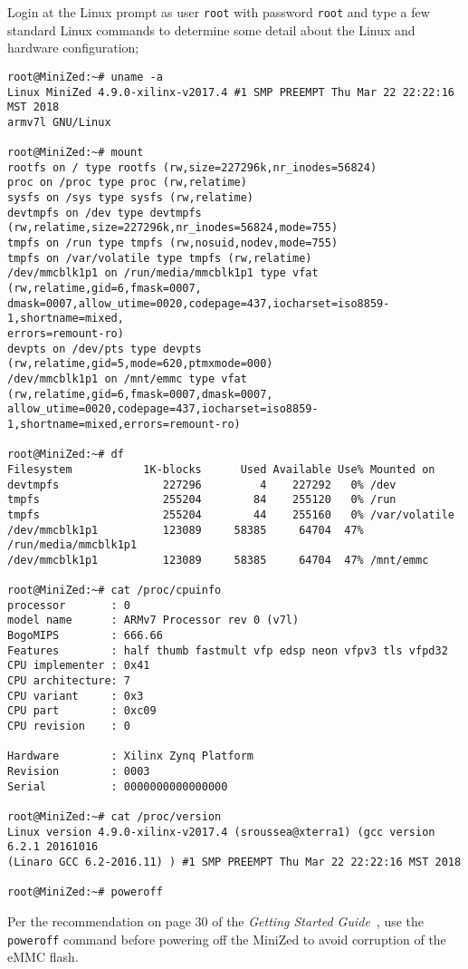 \newpage
Login at the Linux prompt as user \verb+root+ with password \verb+root+
and type a few standard Linux commands to determine some detail about
the Linux and hardware configuration;
%
\begin{verbatim}
root@MiniZed:~# uname -a
Linux MiniZed 4.9.0-xilinx-v2017.4 #1 SMP PREEMPT Thu Mar 22 22:22:16 MST 2018
armv7l GNU/Linux

root@MiniZed:~# mount
rootfs on / type rootfs (rw,size=227296k,nr_inodes=56824)
proc on /proc type proc (rw,relatime)
sysfs on /sys type sysfs (rw,relatime)
devtmpfs on /dev type devtmpfs (rw,relatime,size=227296k,nr_inodes=56824,mode=755)
tmpfs on /run type tmpfs (rw,nosuid,nodev,mode=755)
tmpfs on /var/volatile type tmpfs (rw,relatime)
/dev/mmcblk1p1 on /run/media/mmcblk1p1 type vfat (rw,relatime,gid=6,fmask=0007,
dmask=0007,allow_utime=0020,codepage=437,iocharset=iso8859-1,shortname=mixed,
errors=remount-ro)
devpts on /dev/pts type devpts (rw,relatime,gid=5,mode=620,ptmxmode=000)
/dev/mmcblk1p1 on /mnt/emmc type vfat (rw,relatime,gid=6,fmask=0007,dmask=0007,
allow_utime=0020,codepage=437,iocharset=iso8859-1,shortname=mixed,errors=remount-ro)

root@MiniZed:~# df
Filesystem           1K-blocks      Used Available Use% Mounted on
devtmpfs                227296         4    227292   0% /dev
tmpfs                   255204        84    255120   0% /run
tmpfs                   255204        44    255160   0% /var/volatile
/dev/mmcblk1p1          123089     58385     64704  47% /run/media/mmcblk1p1
/dev/mmcblk1p1          123089     58385     64704  47% /mnt/emmc

root@MiniZed:~# cat /proc/cpuinfo
processor       : 0
model name      : ARMv7 Processor rev 0 (v7l)
BogoMIPS        : 666.66
Features        : half thumb fastmult vfp edsp neon vfpv3 tls vfpd32
CPU implementer : 0x41
CPU architecture: 7
CPU variant     : 0x3
CPU part        : 0xc09
CPU revision    : 0

Hardware        : Xilinx Zynq Platform
Revision        : 0003
Serial          : 0000000000000000

root@MiniZed:~# cat /proc/version
Linux version 4.9.0-xilinx-v2017.4 (sroussea@xterra1) (gcc version 6.2.1 20161016
(Linaro GCC 6.2-2016.11) ) #1 SMP PREEMPT Thu Mar 22 22:22:16 MST 2018

root@MiniZed:~# poweroff
\end{verbatim}
%
Per the recommendation on page 30 of the \emph{Getting Started Guide}~\cite{Avnet_MiniZed_GSG_2018},
use the \verb+poweroff+ command before powering off the MiniZed to avoid corruption of the eMMC flash.

